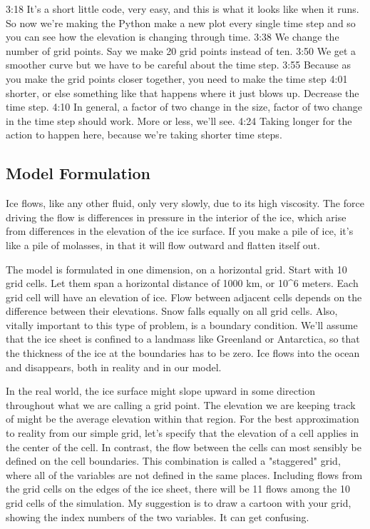 {3:18
It's a short little code, very easy, and this is what it looks like when it runs. So now we're making the Python make a new plot every single time step and so you can see how the elevation is changing through time. 
3:38
We change the number of grid points. Say we make 20 grid points instead of ten. 
3:50
We get a smoother curve but we have to be careful about the time step. 
3:55
Because as you make the grid points closer together, you need to make the time step 
4:01
shorter, or else something like that happens where it just blows up. Decrease the time step. 
4:10
In general, a factor of two change in the size, factor of two change in the time step should work. More or less, we'll see. 
4:24
Taking longer for the action to happen here, because we're taking shorter time steps. 

\subsection{Model Formulation}\index{}
Ice flows, like any other fluid, only very slowly, due to its high viscosity. The force driving the flow is differences in pressure in the interior of the ice, which arise from differences in the elevation of the ice surface. If you make a pile of ice, it's like a pile of molasses, in that it will flow outward and flatten itself out.

The model is formulated in one dimension, on a horizontal grid. Start with 10 grid cells. Let them span a horizontal distance of 1000 km, or 10^6 meters. Each grid cell will have an elevation of ice. Flow between adjacent cells depends on the difference between their elevations. Snow falls equally on all grid cells. Also, vitally important to this type of problem, is a boundary condition. We'll assume that the ice sheet is confined to a landmass like Greenland or Antarctica, so that the thickness of the ice at the boundaries has to be zero. Ice flows into the ocean and disappears, both in reality and in our model.

In the real world, the ice surface might slope upward in some direction throughout what we are calling a grid point. The elevation we are keeping track of might be the average elevation within that region. For the best approximation to reality from our simple grid, let's specify that the elevation of a cell applies in the center of the cell. In contrast, the flow between the cells can most sensibly be defined on the cell boundaries. This combination is called a "staggered" grid, where all of the variables are not defined in the same places. Including flows from the grid cells on the edges of the ice sheet, there will be 11 flows among the 10 grid cells of the simulation. My suggestion is to draw a cartoon with your grid, showing the index numbers of the two variables. It can get confusing.

}
